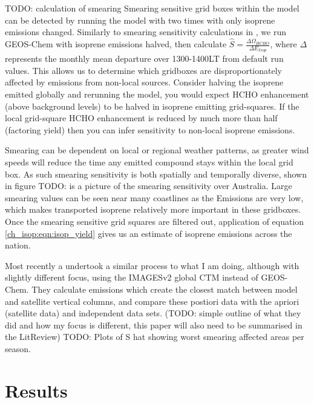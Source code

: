     TODO: calculation of smearing
    Smearing sensitive grid boxes within the model can be detected by running the model with two times with only isoprene emissions changed.
    Similarly to smearing sensitivity calculations in \cite{Marais2012}, we run GEOS-Chem with isoprene emissions halved, then calculate $\hat{S} = \frac{\Delta \Omega_{HCHO}}{\Delta E_{Isop}} $, where $\Delta$ represents the monthly mean departure over 1300-1400LT from default run values.
    This allows us to determine which gridboxes are disproportionately affected by emissions from non-local sources.
    Consider halving the isoprene emitted globally and rerunning the model, you would expect HCHO enhancement (above background levels) to be halved in isoprene emitting grid-squares.
    If the local grid-square HCHO enhancement is reduced by much more than half (factoring yield) then you can infer sensitivity to non-local isoprene emissions.
    
    Smearing can be dependent on local or regional weather patterns, as greater wind speeds will reduce the time any emitted compound stays within the local grid box.
    As such smearing sensitivity is both spatially and temporally diverse, shown in figure TODO: is a picture of the smearing sensitivity over Australia.
    Large smearing values can be seen near many coastlines as the Emissions are very low, which makes transported isoprene relatively more important in these gridboxes.
    Once the smearing sensitive grid squares are filtered out, application of equation \ref{ch_isop:eqn:isop_yield} gives us an estimate of isoprene emissions across the nation.
    
    Most recently a \citet{Bauwens2016} undertook a similar process to what I am doing, although with slightly different focus, using the IMAGESv2 global CTM instead of GEOS-Chem.
    They calculate emissions which create the closest match between model and satellite vertical columns, and compare these postiori data with the apriori (satellite data) and independent data sets.
    (TODO: simple outline of what they did and how my focus is different, this paper will also need to be summarised in the LitReview)
    TODO: Plots of S hat showing worst smearing affected areas per season.
    
    
\section{Results}
  \label{BioIsop:Results}
  
  

